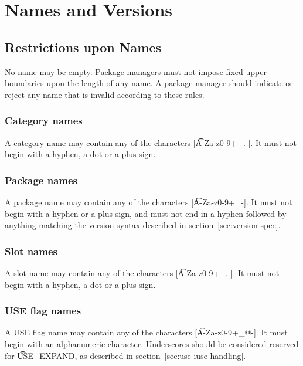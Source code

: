 \chapter{Names and Versions}

\section{Restrictions upon Names}

No name may be empty. Package managers must not impose fixed upper boundaries upon the length of any
name. A package manager should indicate or reject any name that is invalid according to these rules.

\subsection{Category names}
A category name may contain any of the characters [\t{A-Za-z0-9+_.-}]. It must not begin with
a hyphen, a dot or a plus sign.

\subsection{Package names}
\label{sec:package-names}
A package name may contain any of the characters [\t{A-Za-z0-9+_-}]. It must not begin with a
hyphen or a plus sign, and must not end in a hyphen followed by anything matching the version
syntax described in section~\ref{sec:version-spec}.


\subsection{Slot names}
\label{sec:slot-names}
A slot name may contain any of the characters [\t{A-Za-z0-9+_.-}]. It must not begin with a
hyphen, a dot or a plus sign.

\subsection{USE flag names}
A USE flag name may contain any of the characters [\t{A-Za-z0-9+_@-}]. It must begin with an
alphanumeric character. Underscores should be considered reserved for \t{USE_EXPAND}, as
described in section~\ref{sec:use-iuse-handling}.


